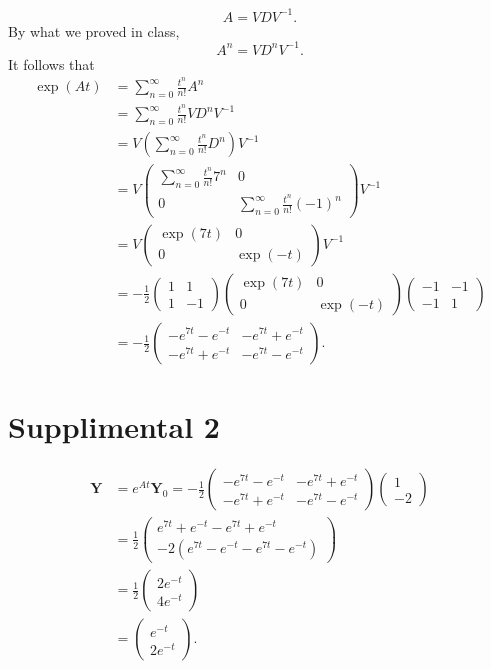 \documentclass[11pt, letterpaper]{report}
\begin{document}
\[
	A=VDV^{-1}
.\]
By what we proved in class,
\[
	A^n=VD^nV^{-1}
.\]
It follows that
\begin{align*}
	\exp (At)&=\sum_{n=0}^{\infty} \frac{t^n}{n!}A^n\\
		 &=\sum_{n=0}^{\infty} \frac{t^n}{n!}VD^nV^{-1}\\
		 &=V\left( \sum_{n=0}^{\infty} \frac{t^n}{n!}D^n \right) V^{-1}\\
		 &=V \begin{pmatrix}
			 \sum_{n=0}^{\infty} \frac{t^n}{n!}7^n&0\\
			 0&\sum_{n=0}^{\infty} \frac{t^n}{n!}(-1)^n
		 \end{pmatrix} V^{-1}\\
		 &=V\begin{pmatrix}
			 \exp (7t)&0\\
			 0&\exp (-t)
		 \end{pmatrix} V^{-1}\\
		 &=-\frac{1}{2}\begin{pmatrix}
			 1&1\\
			 1&-1
		 \end{pmatrix} \begin{pmatrix}
			 \exp (7t)&0\\
			 0&\exp (-t)
		 \end{pmatrix} \begin{pmatrix}
			 -1&-1\\
			 -1&1
		 \end{pmatrix} \\
		 &=-\frac{1}{2}\begin{pmatrix}
			 -e^{7t}-e^{-t}&-e^{7t}+e^{-t}\\
			 -e^{7t}+e^{-t}&-e^{7t}-e^{-t}
		 \end{pmatrix} 
.\end{align*}
\section*{Supplimental 2}
\begin{align*}
	\mathbf{Y}&=e^{At} \mathbf{Y}_0 = -\frac{1}{2}\begin{pmatrix} 
			 -e^{7t}-e^{-t}&-e^{7t}+e^{-t}\\
			 -e^{7t}+e^{-t}&-e^{7t}-e^{-t}
		 \end{pmatrix} \begin{pmatrix}
		 	1\\
			-2
		 \end{pmatrix} \\
		  &=\frac{1}{2}\begin{pmatrix}
		  	e^{7t}+e^{-t}-e^{7t}+e^{-t}\\
			-2\left( e^{7t}-e^{-t}-e^{7t}-e^{-t} \right) 
		  \end{pmatrix} \\
		  &=\frac{1}{2}\begin{pmatrix}
		  	2e^{-t}\\
			4e^{-t}
		  \end{pmatrix} \\
		  &=\begin{pmatrix}
		  	e^{-t}\\
			2e^{-t}
		  \end{pmatrix} 
.\end{align*}
\end{document}
